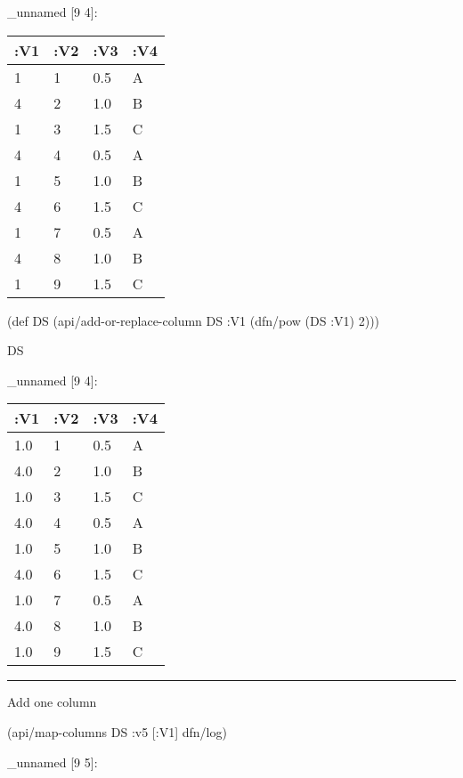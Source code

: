 \documentclass[]{article}
\newenvironment{Shaded}{\begin{snugshade}}{\end{snugshade}}
\newcommand{\AttributeTok}[1]{\textcolor[rgb]{0.77,0.63,0.00}{#1}}
\newcommand{\BuiltInTok}[1]{#1}
\newcommand{\DecValTok}[1]{\textcolor[rgb]{0.00,0.00,0.81}{#1}}
\newcommand{\FunctionTok}[1]{\textcolor[rgb]{0.00,0.00,0.00}{#1}}
\newcommand{\NormalTok}[1]{#1}
\begin{document}
\_unnamed {[}9 4{]}:

\begin{longtable}[]{@{}llll@{}}
\toprule
:V1 & :V2 & :V3 & :V4\tabularnewline
\midrule
\endhead
1 & 1 & 0.5 & A\tabularnewline
4 & 2 & 1.0 & B\tabularnewline
1 & 3 & 1.5 & C\tabularnewline
4 & 4 & 0.5 & A\tabularnewline
1 & 5 & 1.0 & B\tabularnewline
4 & 6 & 1.5 & C\tabularnewline
1 & 7 & 0.5 & A\tabularnewline
4 & 8 & 1.0 & B\tabularnewline
1 & 9 & 1.5 & C\tabularnewline
\bottomrule
\end{longtable}

\begin{Shaded}
\begin{Highlighting}[]
\NormalTok{(}\BuiltInTok{def}\FunctionTok{ DS }\NormalTok{(api/add-or-replace-column DS }\AttributeTok{:V1}\NormalTok{ (dfn/pow (DS }\AttributeTok{:V1}\NormalTok{) }\DecValTok{2}\NormalTok{)))}
\end{Highlighting}
\end{Shaded}

\begin{Shaded}
\begin{Highlighting}[]
\NormalTok{DS}
\end{Highlighting}
\end{Shaded}

\_unnamed {[}9 4{]}:

\begin{longtable}[]{@{}llll@{}}
\toprule
:V1 & :V2 & :V3 & :V4\tabularnewline
\midrule
\endhead
1.0 & 1 & 0.5 & A\tabularnewline
4.0 & 2 & 1.0 & B\tabularnewline
1.0 & 3 & 1.5 & C\tabularnewline
4.0 & 4 & 0.5 & A\tabularnewline
1.0 & 5 & 1.0 & B\tabularnewline
4.0 & 6 & 1.5 & C\tabularnewline
1.0 & 7 & 0.5 & A\tabularnewline
4.0 & 8 & 1.0 & B\tabularnewline
1.0 & 9 & 1.5 & C\tabularnewline
\bottomrule
\end{longtable}

\begin{center}\rule{0.5\linewidth}{0.5pt}\end{center}

Add one column

\begin{Shaded}
\begin{Highlighting}[]
\NormalTok{(api/map-columns DS }\AttributeTok{:v5}\NormalTok{ [}\AttributeTok{:V1}\NormalTok{] dfn/log)}
\end{Highlighting}
\end{Shaded}

\_unnamed {[}9 5{]}:
\end{document}
